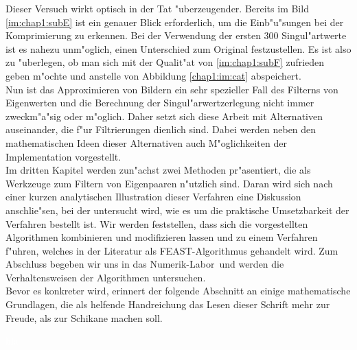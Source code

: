 Dieser Versuch wirkt optisch in der Tat "uberzeugender. Bereits im Bild \ref{im:chap1:subE} ist ein genauer Blick erforderlich, um die Einb"u"sungen bei der Komprimierung zu erkennen.
Bei der Verwendung der ersten 300 Singul"artwerte ist es nahezu unm"oglich, einen Unterschied zum Original festzustellen.
Es ist also zu "uberlegen, ob man sich mit der Qualit"at von \ref{im:chap1:subF} zufrieden geben m"ochte und anstelle von Abbildung \ref{chap1:im:cat} abspeichert.\\

Nun ist das Approximieren von Bildern ein sehr spezieller Fall des Filterns von Eigenwerten und die Berechnung der Singul"arwertzerlegung nicht immer zweckm"a"sig oder m"oglich.
Daher setzt sich diese Arbeit mit Alternativen auseinander, die f"ur Filtrierungen dienlich sind. Dabei werden neben den mathematischen Ideen dieser Alternativen auch M"oglichkeiten der Implementation vorgestellt.\\

Im dritten Kapitel werden zun"achst zwei Methoden pr"asentiert, die als Werkzeuge zum Filtern von Eigenpaaren n"utzlich sind.
Daran wird sich nach einer kurzen analytischen Illustration dieser Verfahren eine Diskussion anschlie"sen, bei der untersucht wird, wie es um die praktische Umsetzbarkeit der Verfahren bestellt ist.
Wir werden feststellen, dass sich die vorgestellten Algorithmen kombinieren und modifizieren lassen und zu einem Verfahren f"uhren, welches in der Literatur als FEAST-Algorithmus gehandelt wird. Zum Abschluss begeben wir uns in das \glqq Numerik-Labor\grqq\ und werden die Verhaltensweisen der Algorithmen untersuchen.\\

Bevor es konkreter wird, erinnert der folgende Abschnitt an einige mathematische Grundlagen, die als helfende Handreichung das Lesen dieser Schrift mehr zur Freude, als zur Schikane machen soll.

\newpage
\textcolor{white}{bla}
